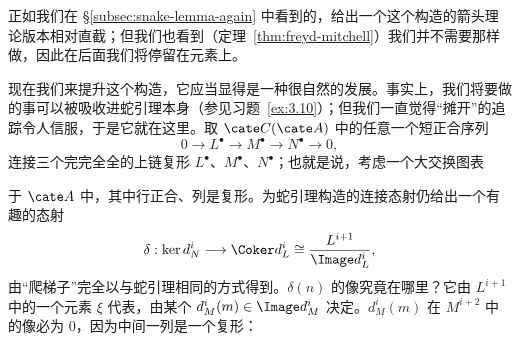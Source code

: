 正如我们在 \S\ref{subsec:snake-lemma-again} 中看到的，给出一个这个构造的箭头理论版本相对直截；但我们也看到（定理~\ref{thm:freyd-mitchell}）我们并不需要那样做，因此在后面我们将停留在元素上。

现在我们来提升这个构造，它应当显得是一种很自然的发展。事实上，我们将要做的事可以被吸收进蛇引理本身（参见习题~\ref{ex:3.10}）；但我们一直觉得“摊开”的追踪令人信服，于是它就在这里。取 $\cate C(\cate A)$ 中的任意一个短正合序列
\[
0\longrightarrow L^\bullet\longrightarrow M^\bullet\longrightarrow N^\bullet\longrightarrow 0,
\]
连接三个完完全全的上链复形 $L^\bullet$、$M^\bullet$、$N^\bullet$；也就是说，考虑一个大交换图表
\begin{center}
\end{center}
于 $\cate A$ 中，其中行正合、列是复形。为蛇引理构造的连接态射仍给出一个有趣的态射
\[
\delta:\ker d_N^i\longrightarrow \Coker d_L^i\cong\frac{L^{i+1}}{\Image d_L^i},
\]
由“爬梯子”完全以与蛇引理相同的方式得到。$\delta(n)$ 的像究竟在哪里？它由 $L^{i+1}$ 中的一个元素 $\xi$ 代表，由某个 $d_M^i(m)\in \Image d_M^i$ 决定。$d_M^i(m)$ 在 $M^{i+2}$ 中的像必为 $0$，因为中间一列是一个复形：
\begin{center}
\end{center}

